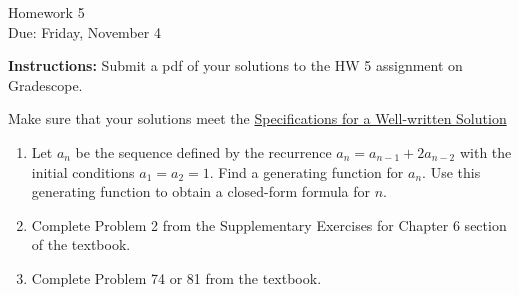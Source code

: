 \documentclass[12pt]{article}
\begin{document}
\begin{center}
{\Large Homework 5}\\
Due: Friday, November 4\\


\end{center}
{\bf Instructions:} Submit a pdf of your solutions to the HW 5 assignment on Gradescope. 

Make sure that your solutions meet the \href{https://docs.google.com/document/d/18LfQoqi6BsY2VdAlpC5xdYEA2rxSGoH0891nVec4_Os/edit?usp=sharing}{Specifications for a Well-written Solution} 

\begin{enumerate}
\item Let $a_n$ be the sequence defined by the recurrence $a_n=a_{n-1}+2a_{n-2}$ with the initial conditions $a_1=a_2=1$. Find a generating function for $a_n$. Use this generating function to obtain a closed-form formula for $n$. 
\item Complete Problem 2 from the Supplementary Exercises for Chapter 6 section of the textbook. 
 \item Complete Problem 74 or 81 from the textbook. 

\end{enumerate}
\end{document}
